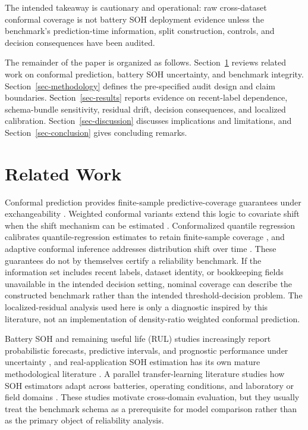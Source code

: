 \documentclass[
  number,
  preprint]{elsarticle}
\begin{document}
The intended takeaway is cautionary and operational: raw cross-dataset
conformal coverage is not battery SOH deployment evidence unless the
benchmark's prediction-time information, split construction, controls,
and decision consequences have been audited.

The remainder of the paper is organized as follows.
Section~\ref{sec-related-work} reviews related work on conformal
prediction, battery SOH uncertainty, and benchmark integrity.
Section~\ref{sec-methodology} defines the pre-specified audit design and
claim boundaries. Section~\ref{sec-results} reports evidence on
recent-label dependence, schema-bundle sensitivity, residual drift,
decision consequences, and localized calibration.
Section~\ref{sec-discussion} discusses implications and limitations, and
Section~\ref{sec-conclusion} gives concluding remarks.

\section{Related Work}\label{sec-related-work}

Conformal prediction provides finite-sample predictive-coverage
guarantees under exchangeability
\citep{vovk2005algorithmic, lei2018distributionfree}. Weighted conformal
variants extend this logic to covariate shift when the shift mechanism
can be estimated \citep{tibshirani2019covariate}. Conformalized quantile
regression calibrates quantile-regression estimates to retain
finite-sample coverage \citep{romano2019conformalized}, and adaptive
conformal inference addresses distribution shift over time
\citep{gibbs2021adaptive}. These guarantees do not by themselves certify
a reliability benchmark. If the information set includes recent labels,
dataset identity, or bookkeeping fields unavailable in the intended
decision setting, nominal coverage can describe the constructed
benchmark rather than the intended threshold-decision problem. The
localized-residual analysis used here is only a diagnostic inspired by
this literature, not an implementation of density-ratio weighted
conformal prediction.

Battery SOH and remaining useful life (RUL) studies increasingly report
probabilistic forecasts, predictive intervals, and prognostic
performance under uncertainty
\citep{saxena2010evaluating, he2011remaining, liu2020futurecapacity},
and real-application SOH estimation has its own mature methodological
literature \citep{berecibar2016critical}. A parallel transfer-learning
literature studies how SOH estimators adapt across batteries, operating
conditions, and laboratory or field domains
\citep{ye2021domainadversarial, vilsen2022field, shen2024review}. These
studies motivate cross-domain evaluation, but they usually treat the
benchmark schema as a prerequisite for model comparison rather than as
the primary object of reliability analysis.
\end{document}
